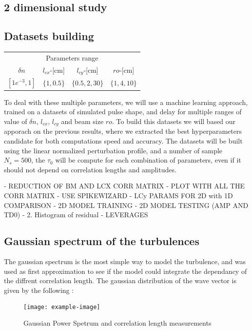 \documentclass[11pt,a4paper]{report}
\begin{document}
\begin{multicols*}{2}


    \section{2 dimensional study}
    \subsection{Datasets building}
    \begin{center}
        \begin{tabular}{cccc}
            \toprule
            \multicolumn{4}{c}{Parameters range}                            \\
            \cmidrule{1 -4}
            $\delta n$     & $l_{cx}$-[cm] & $l_{cy}$-[cm]   & $ro$-[cm]    \\
            \midrule
            $[1e^{-3}, 1]$ & $\{1, 0.5 \}$ & $\{0.5,2,30 \}$ & $\{1,4,10\}$ \\
            \bottomrule
        \end{tabular}
    \end{center}
    To deal with these multiple parameters, we will use a machine learning approach, trained on a datasets of simulated pulse shape, and delay for multiple ranges of value of $\delta n$, $l_{cx}$, $l_{cy}$ and beam size $ro$.
    To build this datasets we will based our apporach on the previous results, where we extracted the best hyperparameters candidate for both computations speed and accuracy. The datasets will be built using the linear normalized perturbation profile, and a number of sample $N_s = 500$, the $\tau_0$ will be compute for each combination of parameters, even if it should not depend on correlation lengths and amplitudes.

    - REDUCTION OF BM AND LCX CORR MATRIX
    - PLOT WITH ALL THE CORR MATRIX
    - USE SPIKEWIZARD
    - LCy PARAMS FOR 2D with 1D COMPARISON
    - 2D MODEL TRAINING
    - 2D MODEL TESTING (AMP AND TD0)
    - 2. Histogram of residual
    - LEVERAGES
    \subsection{Gaussian spectrum of the turbulences}
    The gaussian spectrum is the most simple way to model the turbulence, and was used as first approximation to see if the model could integrate the dependancy of the diffrent correlation length.
    The gaussian distribution of the wave vector is given by the following :
    \begin{figure}[H]        \centering
        \texttt{[image: example-image]}
        \caption{Gaussian Power Spetrum and correlation length measurements}
        \label{}
    \end{figure}

\end{multicols*}
\end{document}
